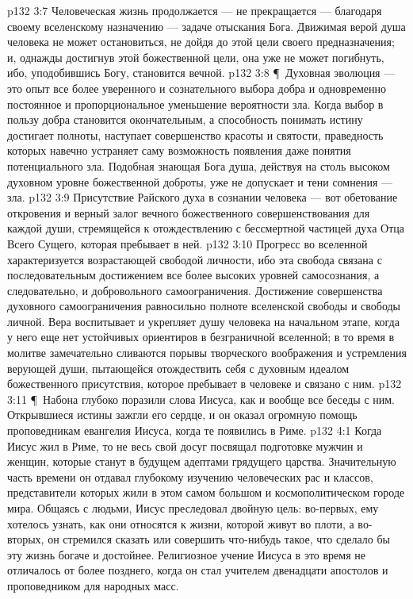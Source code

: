 \vs p132 3:7 Человеческая жизнь продолжается --- не прекращается --- благодаря своему вселенскому назначению --- задаче отыскания Бога. Движимая верой душа человека не может остановиться, не дойдя до этой цели своего предназначения; и, однажды достигнув этой божественной цели, она уже не может погибнуть, ибо, уподобившись Богу, становится вечной.
\vs p132 3:8 \P\ Духовная эволюция --- это опыт все более уверенного и сознательного выбора добра и одновременно постоянное и пропорциональное уменьшение вероятности зла. Когда выбор в пользу добра становится окончательным, а способность понимать истину достигает полноты, наступает совершенство красоты и святости, праведность которых навечно устраняет саму возможность появления даже понятия потенциального зла. Подобная знающая Бога душа, действуя на столь высоком духовном уровне божественной доброты, уже не допускает и тени сомнения --- зла.
\vs p132 3:9 Присутствие Райского духа в сознании человека --- вот обетование откровения и верный залог вечного божественного совершенствования для каждой души, стремящейся к отождествлению с бессмертной частицей духа Отца Всего Сущего, которая пребывает в ней.
\vs p132 3:10 Прогресс во вселенной характеризуется возрастающей свободой личности, ибо эта свобода связана с последовательным достижением все более высоких уровней самосознания, а следовательно, и добровольного самоограничения. Достижение совершенства духовного самоограничения равносильно полноте вселенской свободы и свободы личной. Вера воспитывает и укрепляет душу человека на начальном этапе, когда у него еще нет устойчивых ориентиров в безграничной вселенной; в то время в молитве замечательно сливаются порывы творческого воображения и устремления верующей души, пытающейся отождествить себя с духовным идеалом божественного присутствия, которое пребывает в человеке и связано с ним.
\vs p132 3:11 \P\ Набона глубоко поразили слова Иисуса, как и вообще все беседы с ним. Открывшиеся истины зажгли его сердце, и он оказал огромную помощь проповедникам евангелия Иисуса, когда те появились в Риме.
\vs p132 4:1 Когда Иисус жил в Риме, то не весь свой досуг посвящал подготовке мужчин и женщин, которые станут в будущем адептами грядущего царства. Значительную часть времени он отдавал глубокому изучению человеческих рас и классов, представители которых жили в этом самом большом и космополитическом городе мира. Общаясь с людьми, Иисус преследовал двойную цель: во\hyp{}первых, ему хотелось узнать, как они относятся к жизни, которой живут во плоти, а во\hyp{}вторых, он стремился сказать или совершить что\hyp{}нибудь такое, что сделало бы эту жизнь богаче и достойнее. Религиозное учение Иисуса в это время не отличалось от более позднего, когда он стал учителем двенадцати апостолов и проповедником для народных масс.
